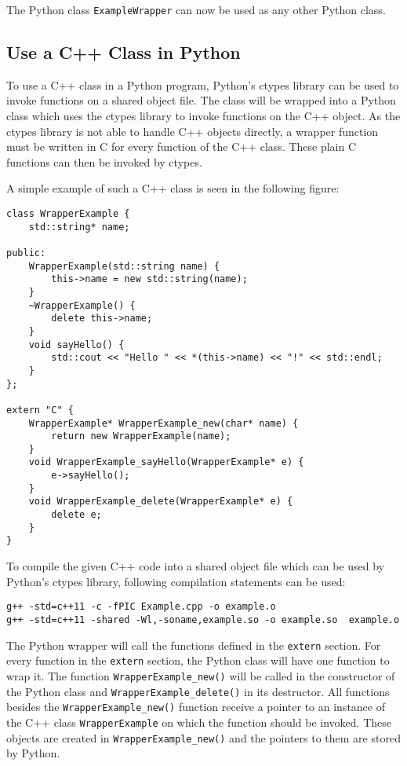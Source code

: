 \documentclass{acm_proc_article-sp}
\begin{document}
The Python class \texttt{ExampleWrapper} can now be used as any other Python class.

\subsection{Use a C++ Class in Python}
To use a C++ class in a Python program, Python's ctypes library can be used to invoke functions on a shared object file. The class will be wrapped into a Python class which uses the ctypes library to invoke functions on the C++ object. As the ctypes library is not able to handle C++ objects directly, a wrapper function must be written in C for every function of the C++ class. These plain C functions can then be invoked by ctypes.

A simple example of such a C++ class is seen in the following figure:

\begin{lstlisting}[caption=Example C++ class for wrapping a C++ object in a Python object (Example.cpp)]
class WrapperExample {
    std::string* name;
    
public:
    WrapperExample(std::string name) {
        this->name = new std::string(name);
    }
    ~WrapperExample() {
        delete this->name;
    }
    void sayHello() {
        std::cout << "Hello " << *(this->name) << "!" << std::endl;
    }
};

extern "C" {
    WrapperExample* WrapperExample_new(char* name) {
        return new WrapperExample(name);
    }
    void WrapperExample_sayHello(WrapperExample* e) {
        e->sayHello();
    }
    void WrapperExample_delete(WrapperExample* e) {
        delete e;
    }
}
\end{lstlisting}

To compile the given C++ code into a shared object file which can be used by Python's ctypes library, following compilation statements can be used:

\lstset{language= bash}
\begin{lstlisting}[caption=Compilation of the C++ class into a shared object file]
g++ -std=c++11 -c -fPIC Example.cpp -o example.o
g++ -std=c++11 -shared -Wl,-soname,example.so -o example.so  example.o
\end{lstlisting}

The Python wrapper will call the functions defined in the \texttt{extern} section. For every function in the \texttt{extern} section, the Python class will have one function to wrap it. The function \texttt{WrapperExample\_new()} will be called in the constructor of the Python class and \texttt{WrapperExample\_delete()} in its  destructor. All functions besides the \texttt{WrapperExample\_new()} function receive a pointer to an instance of the C++ class \texttt{WrapperExample} on which the function should be invoked. These objects are created in \texttt{WrapperExample\_new()} and the pointers to them are stored by Python.
\end{document}
